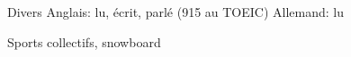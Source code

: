 \begin{rubric}{Divers}
	\entry*[Langues~~~~~~~~~~~~~~~~~~~~~~] Anglais: lu, écrit, parlé (915 au TOEIC)
	\entry* Allemand: lu

	\entry*[Loisirs] Sports collectifs, snowboard
\end{rubric}
